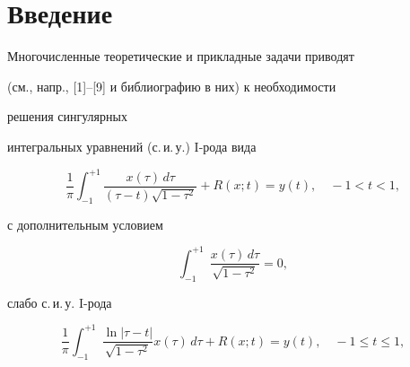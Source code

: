 \date{}




\pagestyle{plain} %







\maketitle


\label{begin}





\section*{Введение}





Многочисленные теоретические и прикладные задачи приводят


(см., напр., [1]--[9] и библиографию в них) к необходимости


решения сингулярных


интегральных уравнений (с.\,и.\,у.) I-рода  вида


\begin{equation}


\frac{1}{\pi}\int_{-1}^{+1}\frac{x(\tau)\, d\tau}{(\tau -t)


\sqrt{1-\tau^2}}+R(x;t)=y(t),\quad -1<t<1,


\tag{0.1}


\end{equation}


с дополнительным условием


\begin{equation}


\int_{-1}^{+1}\;\frac{x(\tau)\, d\tau}{\sqrt{1-\tau^2}}=0,


\tag{0.1$'$}


\end{equation}


слабо с.\,и.\,у. I-рода


\begin{equation}


\frac{1}{\pi}\int_{-1}^{+1}\;\frac{\ln |\tau -t|}


{\sqrt{1-\tau^2}}x(\tau)\, d\tau+R(x;t)=y(t),\quad -1\leq t\leq 1,


\tag{0.2}


\end{equation}


